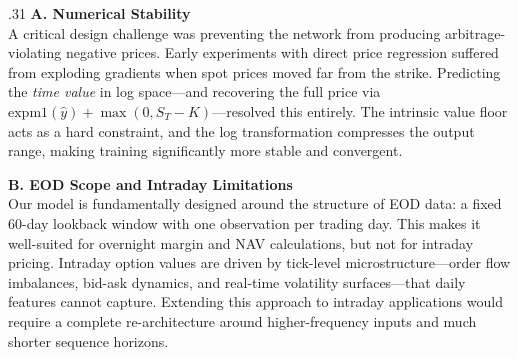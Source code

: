 \documentclass[final]{beamer}
\begin{document}
\begin{frame}[fragile]{}
\begin{columns}[t]
\begin{column}{.31\linewidth}
        \textbf{A. Numerical Stability}\\
        A critical design challenge was preventing the network from producing arbitrage-violating negative prices. Early experiments with direct price regression suffered from exploding gradients when spot prices moved far from the strike. Predicting the \textit{time value} in log space—and recovering the full price via $\text{expm1}(\hat{y}) + \max(0, S_T - K)$—resolved this entirely. The intrinsic value floor acts as a hard constraint, and the log transformation compresses the output range, making training significantly more stable and convergent.
        \vspace{0.8em}

        \textbf{B. EOD Scope and Intraday Limitations}\\
        Our model is fundamentally designed around the structure of EOD data: a fixed 60-day lookback window with one observation per trading day. This makes it well-suited for overnight margin and NAV calculations, but not for intraday pricing. Intraday option values are driven by tick-level microstructure—order flow imbalances, bid-ask dynamics, and real-time volatility surfaces—that daily features cannot capture. Extending this approach to intraday applications would require a complete re-architecture around higher-frequency inputs and much shorter sequence horizons.

    \end{column}

\end{columns}
\end{frame}
\end{document}

